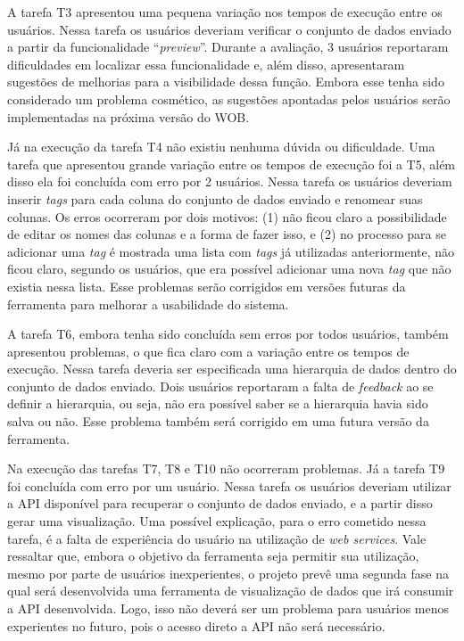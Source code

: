 A tarefa T3 apresentou uma pequena variação nos tempos de execução entre os usuários. 
Nessa tarefa os usuários deveriam verificar o conjunto de dados enviado a partir da 
funcionalidade “\textit{preview}”. Durante a avaliação, 3 usuários reportaram dificuldades em 
localizar essa funcionalidade e, além disso, apresentaram sugestões de melhorias para 
a visibilidade dessa função. Embora esse tenha sido considerado um problema cosmético, 
as sugestões apontadas pelos usuários serão implementadas na próxima versão do WOB.

Já na execução da tarefa T4 não existiu nenhuma dúvida ou dificuldade. Uma tarefa que 
apresentou grande variação entre os tempos de execução foi a T5, além disso ela foi 
concluída com erro por 2 usuários. Nessa tarefa os usuários deveriam inserir \textit{tags} para 
cada coluna do conjunto de dados enviado e renomear suas colunas. Os erros ocorreram por 
dois motivos: (1) não ficou claro a possibilidade de editar os nomes das colunas e a 
forma de fazer isso, e (2) no processo para se adicionar uma \textit{tag} é mostrada uma lista 
com \textit{tags} já utilizadas anteriormente, não ficou claro, segundo os usuários, que era 
possível adicionar uma nova \textit{tag} que não existia nessa lista. Esse problemas serão 
corrigidos em versões futuras da ferramenta para melhorar a usabilidade do sistema.

A tarefa T6, embora tenha sido concluída sem erros por todos usuários, também apresentou 
problemas, o que fica claro com a variação entre os tempos de execução. Nessa tarefa 
deveria ser especificada uma hierarquia de dados dentro do conjunto de dados enviado. 
Dois usuários reportaram a falta de \textit{feedback} ao se definir a hierarquia, ou seja, não era 
possível saber se a hierarquia havia sido salva ou não. Esse problema também será corrigido 
em uma futura versão da ferramenta.

Na execução das tarefas T7, T8 e T10 não ocorreram problemas. Já a tarefa T9 foi concluída 
com erro por um usuário. Nessa tarefa os usuários deveriam utilizar a API disponível para 
recuperar o conjunto de dados enviado, e a partir disso gerar uma visualização. Uma possível 
explicação, para o erro cometido nessa tarefa, é a falta de experiência do usuário na 
utilização de \textit{web services}. Vale ressaltar que, embora o objetivo da ferramenta 
seja permitir sua utilização, mesmo por parte de usuários inexperientes, o projeto prevê uma 
segunda fase na qual será desenvolvida uma ferramenta de visualização de dados que irá 
consumir a API desenvolvida. Logo, isso não deverá ser um problema para usuários menos 
experientes no futuro, pois o acesso direto a API não será necessário.

